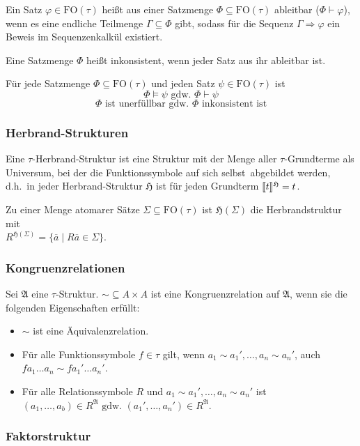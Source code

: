 \documentclass{panikzettel}
\DeclarePairedDelimiter\interpret{\llbracket}{\rrbracket}
\newcommand{\A}{\mathfrak{A}}
\newcommand{\FO}{\mathrm{FO}}
\newcommand{\proves}{\vdash}
\newcommand{\He}{\mathfrak{H}}
\begin{document}
Ein Satz $\varphi \in \FO(\tau)$ heißt aus einer Satzmenge $\Phi \subseteq \FO(\tau)$ ableitbar ($\Phi \proves \varphi$), wenn es eine endliche Teilmenge $\Gamma \subseteq \Phi$ gibt, sodass für die Sequenz $\Gamma \Rightarrow \varphi$ ein Beweis im Sequenzenkalkül existiert.

Eine Satzmenge $\Phi$ heißt inkonsistent, wenn jeder Satz aus ihr ableitbar ist.

Für jede Satzmenge $\Phi \subseteq \FO(\tau)$ und jeden Satz $\psi \in \FO(\tau)$ ist
\[
\Phi \models \psi \text{ gdw.\ } \Phi \proves \psi
\]
\[
\Phi \text{ ist unerfüllbar gdw.\ } \Phi \text{ inkonsistent ist}
\]

\subsubsection{Herbrand-Strukturen}

Eine $\tau$-Herbrand-Struktur ist eine Struktur mit der Menge aller $\tau$-Grundterme als Universum, bei der die Funktionssymbole \glqq auf sich selbst\grqq\ abgebildet werden, d.h.\ in jeder Herbrand-Struktur $\He$ ist für jeden Grundterm $\interpret{t}^\He = t$.

Zu einer Menge atomarer Sätze $\Sigma \subseteq \FO(\tau)$ ist $\He(\Sigma)$ die Herbrandstruktur mit   \\
$R^{\He(\Sigma)} = \{\overline{a} \;|\; R\overline{a} \in \Sigma\}$.

\subsubsection{Kongruenzrelationen}

Sei $\A$ eine $\tau$-Struktur. ${\sim} \subseteq A \times A$ ist eine Kongruenzrelation auf $\A$, wenn sie die folgenden Eigenschaften erfüllt:
\begin{itemize}
\item $\sim$ ist eine Äquivalenzrelation.
\item Für alle Funktionssymbole $f \in \tau$ gilt, wenn $a_1 \sim a_1', \ldots, a_n \sim a_n'$, auch $f a_1 \ldots a_n \sim f a_1' \ldots a_n'$.
\item Für alle Relationssymbole $R$ und $a_1 \sim a_1', \ldots, a_n \sim a_n'$ ist \\$(a_1, \ldots, a_b) \in R^\A \text{ gdw.\ }(a_1', \ldots, a_n') \in R^\A$.
\end{itemize}

\subsubsection{Faktorstruktur}
\end{document}
